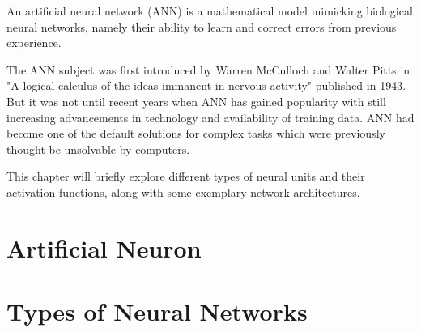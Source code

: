An artificial neural network (ANN) is a mathematical model mimicking biological neural networks,
namely their ability to learn and correct errors from previous experience.\cite{designimplentationcc}\cite{bengio2017deep} 

The ANN subject was first introduced by Warren McCulloch and Walter Pitts in "A logical calculus of the ideas immanent in nervous activity" published in 1943.\cite{mcculloch1943logical} But it was not until recent years when ANN has gained popularity with still increasing advancements in technology and availability of training data. ANN had become one of the default solutions for complex tasks which were previously thought be unsolvable by computers.\cite{neural2016krishtopa}

This chapter will briefly explore different types of neural units and their activation functions, along with some exemplary network architectures.

\section{Artificial Neuron}

\section{Types of Neural Networks}

